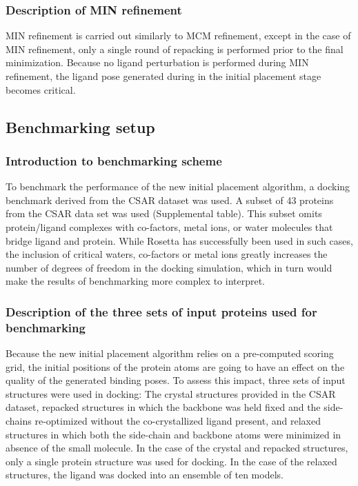\subsubsection{Description of MIN refinement}
MIN refinement is carried out similarly to MCM refinement, except in the case of MIN refinement, only a single round of repacking is performed prior to the final minimization.
Because no ligand perturbation is performed during MIN refinement, the ligand pose generated during in the initial placement stage becomes critical.

\subsection{Benchmarking setup}
\subsubsection{Introduction to benchmarking scheme}
To benchmark the performance of the new initial placement algorithm, a docking benchmark derived from the CSAR\citep{DunbarJr:2011kq} dataset was used.
A subset of 43 proteins from the CSAR data set was used (Supplemental table). %
This subset omits protein/ligand complexes with co-factors, metal ions, or water molecules that bridge ligand and protein.
While Rosetta has successfully been used in such cases\citep{Lemmon:2013jd},  the inclusion of critical waters, co-factors or metal ions greatly increases the number of degrees of freedom in the docking simulation, which in turn would make the results of benchmarking more complex to interpret.
 
\subsubsection{Description of the three sets of input proteins used for benchmarking}
Because the new initial placement algorithm relies on a pre-computed scoring grid, the initial positions of the protein atoms are going to have an effect on the quality of the generated binding poses.
To assess this impact, three sets of input structures were used in docking: The crystal structures provided in the CSAR dataset, repacked structures in which the backbone was held fixed and the side-chains re-optimized without the co-crystallized ligand present, and relaxed structures in which both the side-chain and backbone atoms were minimized in absence of the small molecule.
In the case of the crystal and repacked structures, only a single protein structure was used for docking. In the case of the relaxed structures, the ligand was docked into an ensemble of ten models. 

